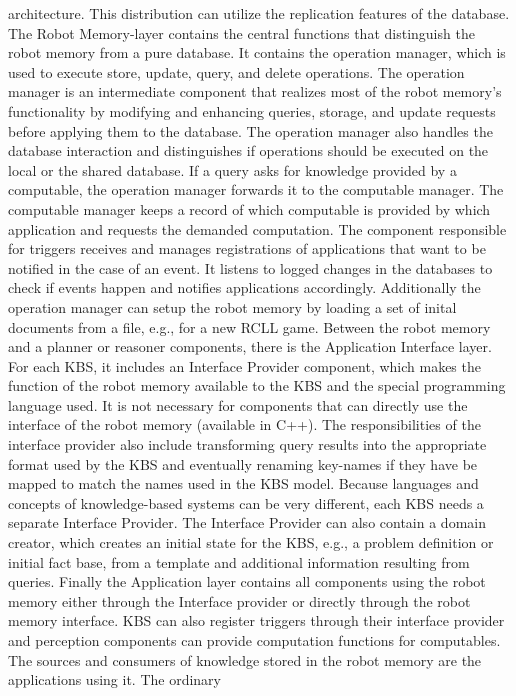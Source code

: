 architecture. This distribution can utilize the replication features
of the database. The Robot Memory-layer contains the central functions
that distinguish the robot memory from a pure database. It contains
the operation manager, which is used to execute store, update, query,
and delete operations. The operation manager is an intermediate
component that realizes most of the robot memory's functionality by
modifying and enhancing queries, storage, and update requests before
applying them to the database. The operation manager also handles the
database interaction and distinguishes if operations should be
executed on the local or the shared database.  If a query asks for
knowledge provided by a computable, the operation manager forwards it
to the computable manager. The computable manager keeps a record of
which computable is provided by which application and requests the
demanded computation. The component responsible for triggers
receives and manages registrations of applications that want to be
notified in the case of an event. It listens to logged changes in the
databases to check if events happen and notifies applications
accordingly. Additionally the operation manager can setup the
robot memory by loading a set of inital documents from a file, e.g., for a new RCLL game.
Between the robot memory and a planner or reasoner components, there
is the Application Interface layer. For each KBS, it includes an
Interface Provider component, which makes the function of the robot
memory available to the KBS and the special programming language
used. It is not necessary for components that can directly use the
interface of the robot memory (available in C++). The responsibilities
of the interface provider also include transforming query results into
the appropriate format used by the KBS and eventually renaming
key-names if they have be mapped to match the names used in the KBS
model. Because languages and concepts of knowledge-based systems can
be very different, each KBS needs a separate Interface Provider. The
Interface Provider can also contain a domain creator, which creates an
initial state for the KBS, e.g., a problem definition or initial fact base, from a
template and additional information resulting from queries. Finally the
Application layer contains all components using the robot memory
either through the Interface provider or directly through the robot
memory interface. KBS can also register triggers through their
interface provider and perception components can provide computation
functions for computables. The sources and consumers of knowledge
stored in the robot memory are the applications using it. The ordinary
